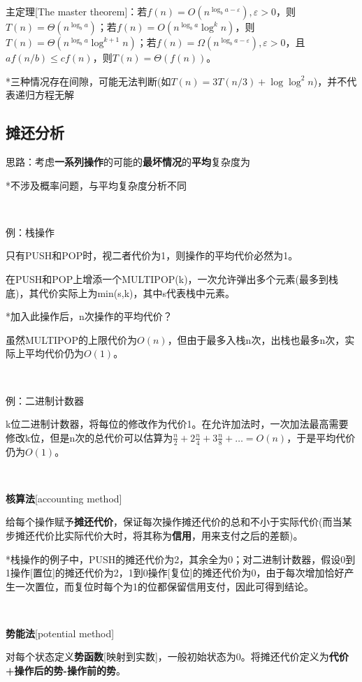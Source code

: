 \documentclass[a4paper,UTF8,fontset=windows]{ctexart}
\begin{document}
主定理[The master theorem]：若$f(n)=O(n^{\log_ba-\varepsilon}),\varepsilon>0$，则$T(n)=\Theta(n^{\log_ba})$；若$f(n)=O(n^{\log_ba}\log^kn)$，则$T(n)=\Theta(n^{\log_ba}\log^{k+1}n)$；若$f(n)=\Omega(n^{\log_ba-\varepsilon}),\varepsilon>0$，且$af(n/b)\le cf(n)$，则$T(n)=\Theta(f(n))$。

*\hspace{0em}三种情况存在间隙，可能无法判断(如$T(n)=3T(n/3)+\log\log^2n$)，并不代表递归方程无解

\subsection{摊还分析}
思路：考虑\textbf{一系列操作}的可能的\textbf{最坏情况}的\textbf{平均}复杂度为

*\hspace{0em}不涉及概率问题，与平均复杂度分析不同

\

例：栈操作

只有PUSH和POP时，视二者代价为1，则操作的平均代价必然为1。

在PUSH和POP上增添一个MULTIPOP(k)，一次允许弹出多个元素(最多到栈底)，其代价实际上为min(s,k)，其中s代表栈中元素。

*\hspace{0em}加入此操作后，n次操作的平均代价？

虽然MULTIPOP的上限代价为$O(n)$，但由于最多入栈n次，出栈也最多n次，实际上平均代价仍为$O(1)$。

\

例：二进制计数器

k位二进制计数器，将每位的修改作为代价1。在允许加法时，一次加法最高需要修改k位，但是n次的总代价可以估算为$\frac{n}{2}+2\frac{n}{4}+3\frac{n}{8}+\dots=O(n)$，于是平均代价仍为$O(1)$。

\

\textbf{核算法}[accounting method]

给每个操作赋予\textbf{摊还代价}，保证每次操作摊还代价的总和不小于实际代价(而当某步摊还代价比实际代价大时，将其称为\textbf{信用}，用来支付之后的差额)。

*\hspace{0em}栈操作的例子中，PUSH的摊还代价为2，其余全为0；对二进制计数器，假设0到1操作[置位]的摊还代价为2，1到0操作[复位]的摊还代价为0，由于每次增加恰好产生一次置位，而复位时每个为1的位都保留信用支付，因此可得到结论。

\

\textbf{势能法}[potential method]

对每个状态定义\textbf{势函数}[映射到实数]，一般初始状态为0。将摊还代价定义为\textbf{代价+操作后的势-操作前的势}。
\end{document}
